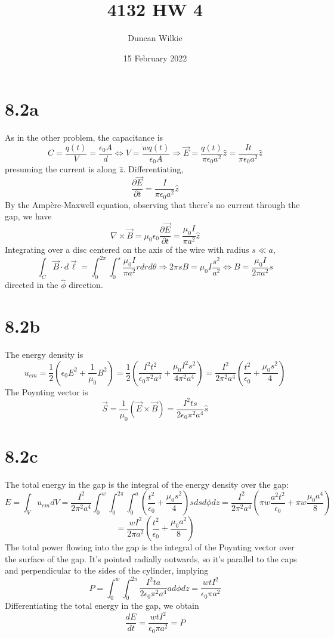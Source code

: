 \documentclass{article}
\title{4132 HW 4}
\author{Duncan Wilkie}
\date{15 February 2022}
\begin{document}
\maketitle

\section*{8.2a}
As in the other problem, the capacitance is
\[C=\frac{q(t)}{V}=\frac{\epsilon_0 A}{d}\Leftrightarrow V=\frac{wq(t)}{\epsilon_0A}\Rightarrow \vec{E}=\frac{q(t)}{\pi\epsilon_0a^2}\hat{z}=\frac{It}{\pi\epsilon_0 a^2}\hat{z}\]
presuming the current is along $\hat{z}$.
Differentiating,
\[\frac{\partial\vec{E}}{\partial t}=\frac{I}{\pi\epsilon_0 a^2}\hat{z}\]
By the Amp\`ere-Maxwell equation, observing that there's no current through the gap, we have
\[\nabla\times \vec{B}=\mu_0\epsilon_0\frac{\partial\vec{E}}{\partial t}=\frac{\mu_0I}{\pi a^2}\hat{z}\]
Integrating over a disc centered on the axis of the wire with radius $s \ll a$,
\[\int_C\vec{B}\cdot d\vec{\ell}=\int_0^{2\pi}\int_0^s \frac{\mu_0I}{\pi a^2}rdrd\theta \Rightarrow 2\pi s B=\mu_0 I \frac{s^2}{a^2} \Leftrightarrow  B = \frac{\mu_0 I}{2\pi a^2}s\]
directed in the $\hat{\phi}$ direction.

\section*{8.2b}
The energy density is
\[u_{em}=\frac{1}{2}\left( \epsilon_0E^2+\frac{1}{\mu_0}B^2 \right)=\frac{1}{2}\left( \frac{I^2t^2}{\epsilon_0\pi^2a^4}+\frac{\mu_0I^2s^2}{4\pi^2a^4} \right)=\frac{I^2}{2\pi^2a^4}\left( \frac{t^2}{\epsilon_0}+\frac{\mu_0 s^2}{4} \right)\]
The Poynting vector is
\[\vec{S}=\frac{1}{\mu_0}\left( \vec{E}\times\vec{B} \right)=\frac{I^2ts}{2\epsilon_0\pi^2a^4}\hat{s}\]

\section*{8.2c}
The total energy in the gap is the integral of the energy density over the gap:
\[E=\int_Vu_{em}dV=\frac{I^2}{2\pi^2a^4}\int_0^w\int_0^{2\pi}\int_0^a\left( \frac{t^2}{\epsilon_0}+\frac{\mu_0 s^2}{4}\right)sdsd\phi dz=\frac{I^2}{2\pi^2a^4}\left( \pi w\frac{a^2t^2}{\epsilon_0} +\pi w\frac{\mu_0a^4}{8}\right)\]
\[=\frac{wI^2}{2\pi a^2}\left( \frac{t^2}{\epsilon_0}+\frac{\mu_0a^2}{8} \right)\]
The total power flowing into the gap is the integral of the Poynting vector over the surface of the gap. It's pointed radially outwards, so it's parallel to the caps and perpendicular to the sides of the cylinder, implying
\[P=\int_0^w\int_0^{2\pi}\frac{I^2ta}{2\epsilon_0\pi^2 a^4}ad\phi dz=\frac{wt I^2}{\epsilon_0\pi a^2}\]
Differentiating the total energy in the gap, we obtain
\[\frac{dE}{dt}=\frac{wtI^2}{\epsilon_0\pi a^2}=P\]
\end{document}
